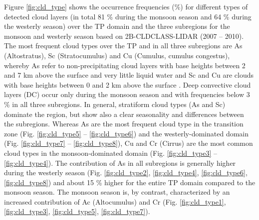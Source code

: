 \documentclass[alpha-refs]{wiley-article}
\begin{document}
Figure \ref{fig:cld_type} shows the occurrence frequencies (\%) for different types of detected cloud layers (in total 81 \% during the monsoon season and 64 \% during the westerly season) over the TP domain and the three subregions for the monsoon and westerly season based on 2B-CLDCLASS-LIDAR (2007 -- 2010). The most frequent cloud types over the TP and in all three subregions are As (Altostratus), Sc (Stratocumulus) and Cu (Cumulus, cumulus congestus), whereby As refer to non-precipitating cloud layers with base heights between 2 and 7 km above the surface and very little liquid water and Sc and Cu are clouds with base heights between 0 and 2 km above the surface \citep{cloudsat_classification}. Deep convective cloud layers (DC) occur only during the monsoon season and with frequencies below 3 \% in all three subregions. In general, stratiform cloud types (As and Sc) dominate the region, but show also a clear seasonality and differences between the subregions. Whereas As are the most frequent cloud type in the transition zone (Fig. \ref{fig:cld_type5} -- \ref{fig:cld_type6}) and the westerly-dominated domain (Fig. \ref{fig:cld_type7} -- \ref{fig:cld_type8}), Cu and Cr (Cirrus) are the most common cloud types in the monsoon-dominated domain (Fig. \ref{fig:cld_type3} -- \ref{fig:cld_type4}). The contribution of As in all subregions is generally higher during the westerly season (Fig. \ref{fig:cld_type2}, \ref{fig:cld_type4}, \ref{fig:cld_type6}, \ref{fig:cld_type8}) and about 15 \% higher for the entire TP domain compared to the monsoon season. The monsoon season is, by contrast, characterized by an increased contribution of Ac (Altocumulus) and Cr (Fig. \ref{fig:cld_type1}, \ref{fig:cld_type3}, \ref{fig:cld_type5}, \ref{fig:cld_type7}). 
\end{document}
